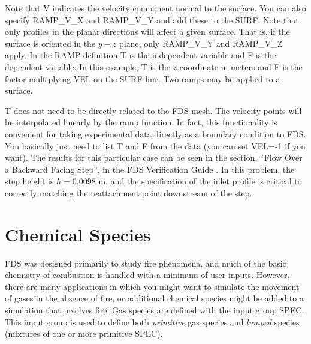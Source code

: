 \documentclass[11pt]{book}
\begin{document}
Note that {\ct V} indicates the velocity component normal to the surface.  You can also specify {\ct RAMP\_V\_X} and {\ct RAMP\_V\_Y} and add these to the {\ct SURF}.  Note that only profiles in the planar directions will affect a given surface.  That is, if the surface is oriented in the $y-z$ plane, only {\ct RAMP\_V\_Y} and {\ct RAMP\_V\_Z} apply.  In the {\ct RAMP} definition {\ct T} is the independent variable and {\ct F} is the dependent variable.  In this example, {\ct T} is the $z$ coordinate in meters and {\ct F} is the factor multiplying {\ct VEL} on the {\ct SURF} line.  Two ramps may be applied to a surface.

{\ct T} does not need to be directly related to the FDS mesh.  The velocity points will be interpolated linearly by the ramp function.  In fact, this functionality is convenient for taking experimental data directly as a boundary condition to FDS.  You basically just need to list {\ct T} and {\ct F} from the data (you can set {\ct VEL=-1} if you want).  The results for this particular case can be seen in the section, ``Flow Over a Backward Facing Step'', in the FDS Verification Guide \cite{FDS_Verification_Guide}. In this problem, the step height is $h=0.0098$ m, and the specification of the inlet profile is critical to correctly matching the reattachment point downstream of the step.


\chapter{Chemical Species}
\label{info:SPEC}

FDS was designed primarily to study fire phenomena, and much of the basic chemistry of combustion is handled with a minimum of user inputs. However, there are many applications in which you might want to simulate the movement of gases in the absence of fire, or additional chemical species might be added to a simulation that involves fire.  Gas species are defined with the input group
{\ct SPEC}.  This input group is used to define both {\em primitive} gas species and {\em lumped} species (mixtures of one or more primitive {\ct SPEC}).
\end{document}
